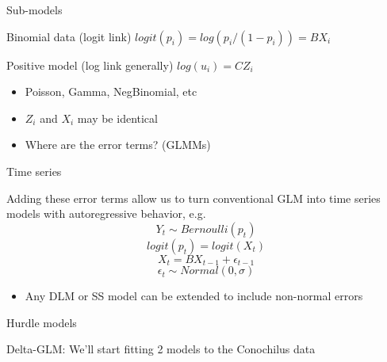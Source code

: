 \documentclass[ignorenonframetext,]{beamer}
\newenvironment{Shaded}{\begin{snugshade}}{\end{snugshade}}
\newcommand{\KeywordTok}[1]{\textcolor[rgb]{0.13,0.29,0.53}{\textbf{#1}}}
\newcommand{\DataTypeTok}[1]{\textcolor[rgb]{0.13,0.29,0.53}{#1}}
\newcommand{\DecValTok}[1]{\textcolor[rgb]{0.00,0.00,0.81}{#1}}
\newcommand{\StringTok}[1]{\textcolor[rgb]{0.31,0.60,0.02}{#1}}
\newcommand{\OperatorTok}[1]{\textcolor[rgb]{0.81,0.36,0.00}{\textbf{#1}}}
\newcommand{\NormalTok}[1]{#1}
\providecommand{\tightlist}{%
  \setlength{\itemsep}{0pt}\setlength{\parskip}{0pt}}
\begin{document}
\begin{frame}{Sub-models}

Binomial data (logit link) \(logit(p_i) = log(p_i/(1-p_i)) = BX_i\)

Positive model (log link generally) \(log(u_i) = CZ_i\)

\begin{itemize}
\tightlist
\item
  Poisson, Gamma, NegBinomial, etc
\item
  \(Z_i\) and \(X_i\) may be identical
\item
  Where are the error terms? (GLMMs)
\end{itemize}

\end{frame}

\begin{frame}{Time series}

Adding these error terms allow us to turn conventional GLM into time
series models with autoregressive behavior, e.g.
\[Y_t \sim Bernoulli(p_t)\] \[logit(p_t) = logit(X_t)\]
\[X_{t} = BX_{t-1} + \epsilon_{t-1}\]
\[\epsilon_t \sim Normal(0, \sigma)\]

\begin{itemize}
\tightlist
\item
  Any DLM or SS model can be extended to include non-normal errors
\end{itemize}

\end{frame}

\begin{frame}[fragile]{Hurdle models}

Delta-GLM: We'll start fitting 2 models to the Conochilus data

\begin{Shaded}
\end{Shaded}

\end{frame}
\end{document}
